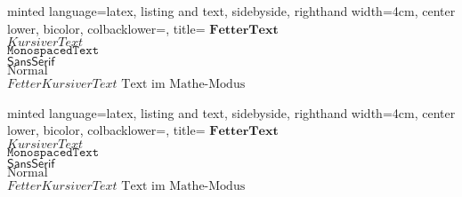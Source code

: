 \documentclass[
    ngerman,
    accentcolor=3b,
    dark_mode,
    fontsize= 12pt,
    a4paper,
    aspectratio=169,
    colorback=true,
    fancy_row_colors,
    leqno,
    fleqn,
    boxarc=3pt,
    fleqn,
]{algoslides}
\begin{document}
    \begin{frame}[c, fragile]
        \slidehead{}
        \begin{codeBlock}[]{
            minted language=latex,
            listing and text,
            sidebyside,
            righthand width=4cm,
            center lower,
            bicolor,
            colbacklower=,
            title=
            }
            $\mathbf{Fetter Text}$\\
            $\mathit{Kursiver Text}$\\
            $\mathtt{Monospaced Text}$\\
            $\mathsf{Sans Serif}$\\
            $\mathrm{Normal}$\\
            $\mathbf{\mathit{Fetter Kursiver Text}}$
            $\text{Text im Mathe-Modus}$
        \end{codeBlock}
    \end{frame}

    \begin{frame}[c, fragile]
        \slidehead{}
        \begin{codeBlock}[highlightlines={7}]{
            minted language=latex,
            listing and text,
            sidebyside,
            righthand width=4cm,
            center lower,
            bicolor,
            colbacklower=,
            title=
            }
            $\mathbf{Fetter Text}$\\
            $\mathit{Kursiver Text}$\\
            $\mathtt{Monospaced Text}$\\
            $\mathsf{Sans Serif}$\\
            $\mathrm{Normal}$\\
            $\mathbf{\mathit{Fetter Kursiver Text}}$
            $\text{Text im Mathe-Modus}$
        \end{codeBlock}
    \end{frame}
\end{document}
